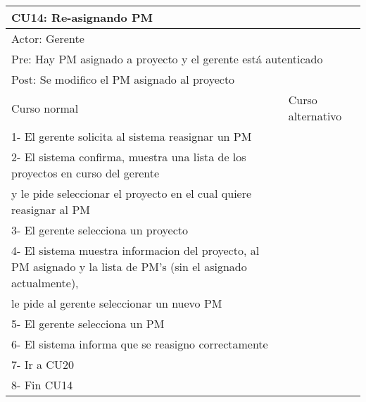 \begin{table}[H]
  \begin{adjustbox}{max width = \textwidth}
  \begin{tabular}{|l|l|}
    \hline
    \multicolumn{2}{|l|}{CU14: Re-asignando PM} \\\hline
    \multicolumn{2}{|l|}{Actor: Gerente} \\\hline
    \multicolumn{2}{|l|}{Pre: Hay PM asignado a proyecto y el gerente está autenticado} \\\hline
    \multicolumn{2}{|l|}{Post: Se modifico el PM asignado al proyecto} \\\hline
     Curso normal & Curso alternativo\\ \hline
	 1- El gerente solicita al sistema reasignar un PM & \\ \hline
	 2- El sistema confirma, muestra una lista de los proyectos en curso del gerente \\ y le pide seleccionar el proyecto en el cual quiere reasignar al PM & \\ \hline
	 3- El gerente selecciona un proyecto & \\ \hline
     4- El sistema muestra informacion del proyecto, al PM asignado y la lista de PM's (sin el asignado actualmente), \\ le pide al gerente seleccionar un nuevo PM & \\ \hline
     5- El gerente selecciona un PM & \\ \hline
	 6- El sistema informa que se reasigno correctamente & \\ \hline
   7- Ir a CU20 & \\ \hline
     8- Fin CU14 & \\ \hline
  \end{tabular}
  \end{adjustbox}
\end{table}


